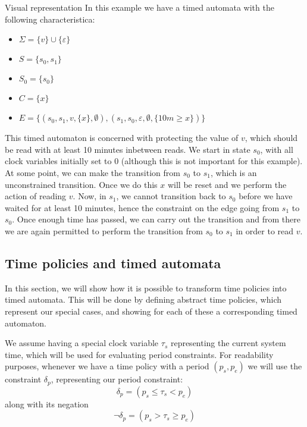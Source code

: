 \begin{example}{Visual representation}\label{time:ex:visualrepresentation}
In this example we have a timed automata with the following characteristica:
\begin{itemize}
  \item $\Sigma = \{ v \} \cup \{ \varepsilon \}$
  \item $S = \{ s_0, s_1 \}$
  \item $S_0 = \{ s_0 \}$
  \item $C = \{ x \}$
  \item $E = \{ (s_0, s_1, v, \{ x \}, \emptyset), (s_1, s_0, \varepsilon, \emptyset, \{ 10m \geq x \})\}$
\end{itemize}
This timed automaton is concerned with protecting the value of $v$, which should be read with at least 10 minutes inbetween reads.
We start in state $s_0$, with all clock variables initially set to $0$ (although this is not important for this example).
At some point, we can make the transition from $s_0$ to $s_1$, which is an unconstrained transition.
Once we do this $x$ will be reset and we perform the action of reading $v$.
Now, in $s_1$, we cannot transition back to $s_0$ before we have waited for at least 10 minutes, hence the constraint on the edge going from $s_1$ to $s_0$.
Once enough time has passed, we can carry out the transition and from there we are again permitted to perform the transition from $s_0$ to $s_1$ in order to read $v$.

  \begin{figure}[H]
    \centering
    
  \end{figure}
\end{example}

\subsection{Time policies and timed automata}\label{automata:timepolicies}
In this section, we will show how it is possible to transform \thelang{} time policies into timed automata.
This will be done by defining abstract time policies, which represent our special cases, and showing for each of these a corresponding timed automaton.

We assume having a special clock variable $\tau_s$ representing the current system time, which will be used for evaluating period constraints.
For readability purposes, whenever we have a time policy with a period $(p_s, p_e)$ we will use the constraint $\delta_p$, representing our period constraint:
\[ \delta_p = (p_s \leq \tau_s < p_e) \]
along with its negation
\[ \lnot\delta_p = (p_s > \tau_s \geq p_e) \]

